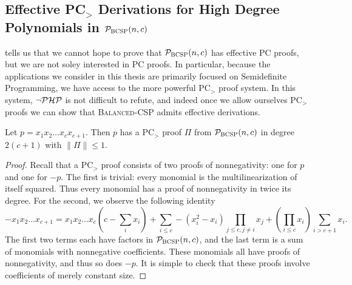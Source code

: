 \subsection{Effective PC$_>$ Derivations for High Degree Polynomials in $\mathcal P_{\textsc{BCSP}}(n,c)$}
 tells us that we cannot hope to prove that $\mathcal P_{\textsc{BCSP}}(n,c)$ has effective PC proofs, but we are not soley interested in PC proofs. In particular, because the applications we consider in this thesis are primarily focused on Semidefinite Programming, we have access to the more powerful PC$_>$ proof system. In this system, $\neg\mathcal P\mathcal H\mathcal P$ is not difficult to refute, and indeed once we allow ourselves PC$_>$ proofs we can show that \textsc{Balanced-CSP} admits effective derivations.
\begin{lemma}\label{lem:highdeg-easy}
Let $p = x_1x_2\dots x_c x_{c+1}$. Then $p$ has a PC$_>$ proof $\Pi$ from $\mathcal P_{\textsc{BCSP}}(n,c)$ in degree $2(c+1)$ with $\|\Pi\| \leq 1$. 
\end{lemma}
\begin{proof}
Recall that a PC$_>$ proof consists of two proofs of nonnegativity: one for $p$ and one for $-p$. The first is trivial: every monomial is the multilinearization of itself squared. Thus every monomial has a proof of nonnegativity in twice its degree. For the second, we observe the following identity
\[-x_1x_2\dots x_{c+1} = x_1x_2\dots x_c\left(c - \sum_i x_i\right) + \sum_{i \leq c} -(x_i^2 - x_i) \prod_{j \leq c, j\neq i} x_j + \left(\prod_{i \leq c} x_i\right) \sum_{i > c+1} x_i. \]
The first two terms each have factors in $\mathcal P_{\textsc{BCSP}}(n,c)$, and the last term is a sum of monomials with nonnegative coefficients. These monomials all have proofs of nonnegativity, and thus so does $-p$. It is simple to check that these proofs involve coefficients of merely constant size. 
\end{proof}


